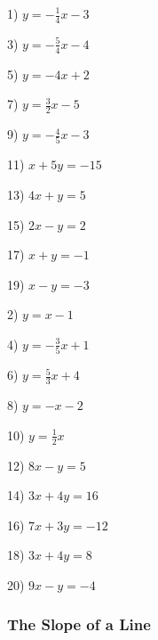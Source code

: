 \begin{multicols}{2}
  1) $y = - \frac{1}{4} x - 3$
  
  3) $y = - \frac{5}{4} x - 4$
  
  5) $y = - 4 x + 2$
  
  7) $y = \frac{3}{2} x - 5$
  
  9) $y = - \frac{4}{5} x - 3$
  
  11) $x + 5 y = - 15$
  
  13) $4 x + y = 5$
  
  15) $2 x - y = 2$
  
  17) $x + y = - 1$
  
  19) $x - y = - 3$
  
  2) $y = x - 1$
  
  4) $y = - \frac{3}{5} x + 1$
  
  6) $y = \frac{5}{3} x + 4$
  
  8) $y = - x - 2$
  
  10) $y = \frac{1}{2} x$
  
  12) $8 x - y = 5$
  
  14) $3 x + 4 y = 16$
  
  16) $7 x + 3 y = - 12$
  
  18) $3 x + 4 y = 8$
  
  20) $9 x - y = - 4$
\end{multicols}

\pagebreak

\subsubsection{The Slope of a Line}\par

